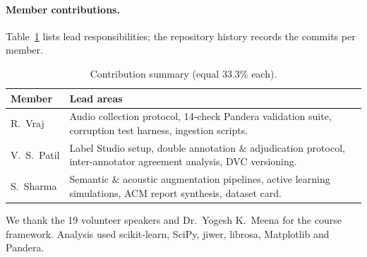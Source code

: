 \documentclass[sigconf,authordraft]{acmart}
\begin{document}
\paragraph{Member contributions.}\label{sec:contrib}
Table~\ref{tab:contrib} lists lead responsibilities; the repository history records the commits per member.
\begin{table}[htbp]
\caption{Contribution summary (equal 33.3\% each).}\label{tab:contrib}
\begin{tabular}{p{1.2cm}p{5.8cm}}
\toprule Member & Lead areas \\ \midrule
R.\ Vraj & Audio collection protocol, 14-check Pandera validation suite, corruption test harness, ingestion scripts. \\
V.\ S.\ Patil & Label Studio setup, double annotation \& adjudication protocol, inter-annotator agreement analysis, DVC versioning. \\
S.\ Sharma & Semantic \& acoustic augmentation pipelines, active learning simulations, ACM report synthesis, dataset card. \\ \bottomrule
\end{tabular}
\end{table}

\begin{acks}
We thank the 19 volunteer speakers and Dr.\ Yogesh K.\ Meena for the course framework. Analysis used scikit-learn, SciPy, jiwer, librosa, Matplotlib and Pandera.
\end{acks}




\appendix
\end{document}

